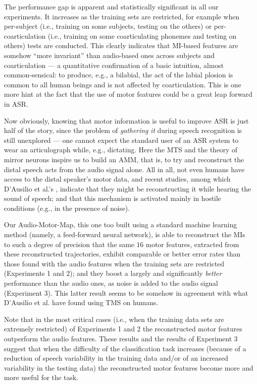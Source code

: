\documentclass{pnastwo}
\begin{document}
\begin{article}
The performance gap is apparent and statistically significant in all our experiments.
It increases as the training sets are restricted, for example
when per-subject (i.e., training on some subjects, testing on the others) or
per-coarticulation (i.e., training on some coarticulating phonemes and testing on
others) tests are conducted. This clearly indicates that MI-based features are
somehow ``more invariant'' than audio-based ones across subjects and
coarticulation --- a quantitative confirmation of a basic
intuition, almost common-sensical: to produce, e.g., a bilabial, the act of
the labial plosion is common to all human beings and is not affected by
coarticulation. This is one more hint at the fact that the use of motor features
could be a great leap forward in ASR.

Now obviously, knowing that motor information is useful to improve ASR is just half
of the story, since the problem of \emph{gathering it} during speech recognition is
still unexplored --- one cannot expect the standard user of an ASR system to wear
an articulograph while, e.g., dictating. Here the MTS and the theory of mirror neurons
inspire us to build an AMM, that is, to try and reconstruct the distal speech acts from
the audio signal alone. All in all, not even humans have access to the distal speaker's
motor data, and recent studies, among which D'Ausilio et al.'s \cite{dausilio}, indicate
that they might be reconstructing it while hearing the sound of speech; and that this
mechanism is activated mainly in hostile conditions (e.g., in the presence of noise).

Our Audio-Motor-Map, this one too built using a standard machine learning
method (namely, a feed-forward neural network), is able to reconstruct the MIs
to such a degree of precision that the same $16$ motor features, extracted from these
reconstructed trajectories, exhibit comparable or better error rates than  
those found with the audio features when the training sets are restricted (Experiments 1 and 2);
 and they boost a largely and significantly \emph{better} performance than the audio ones, as
noise is added to the audio signal (Experiment 3). This latter result seems to be
somehow in agreement with what D'Ausilio et al. have found using TMS on humans.

Note that in the most critical cases (i.e., when the training data sets are extremely restricted) of Experiments 1 and 2
the reconstructed motor features outperform the audio features. These results and the results of Experiment 3
suggest that when the difficulty of the classification task increases (because of a reduction of speech 
variability in the training data and/or of an increased variability in the testing data) the reconstructed 
motor features become more and more useful for the task.


\end{article}
\end{document}
